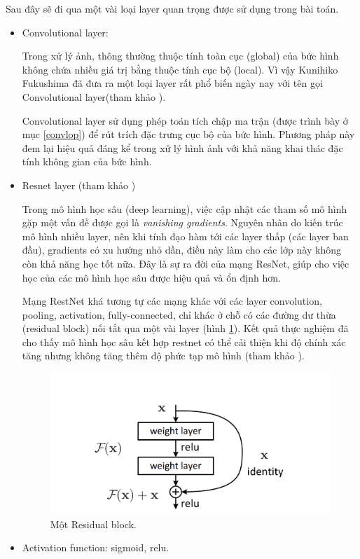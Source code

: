 Sau đây sẽ đi qua một vài loại layer quan trọng được sử dụng trong bài toán.
\begin{itemize}
    \item Convolutional layer:

    Trong xử lý ảnh, thông thường thuộc tính toàn cục (global) của bức hình không chứa nhiều giá trị bằng thuộc tính cục bộ (local). Vì vậy Kunihiko Fukushima đã đưa ra một loại layer rất phổ biến ngày nay với tên gọi Convolutional  layer(tham khảo \cite{fukushima1988neocognitron}).
    
    Convolutional layer sử dụng phép toán tích chập ma trận (được trình bày ở mục \ref{convlop}) để rút trích đặc trưng cục bộ của bức hình. Phương pháp này đem lại hiệu quả đáng kể trong xử lý hình ảnh với khả năng khai thác đặc tính không gian của bức hình.

    \item Resnet layer (tham khảo \cite{he2016deep})
    
    Trong mô hình học sâu (deep learning), việc cập nhật các tham số mô hình gặp một vấn đề được gọi là \textit{vanishing gradients}. Nguyên nhân do kiến trúc mô hình nhiều layer, nên khi tính đạo hàm tới các layer thấp (các layer ban đầu), gradients có xu hướng nhỏ dần, điều này làm cho các lớp này không còn khả năng học tốt nữa. Đây là sự ra đời của mạng ResNet, giúp cho việc học của các mô hình học sâu được hiệu quả và ổn định hơn.

    Mạng RestNet khá tương tự các mạng khác với các layer convolution, pooling, activation, fully-connected, chỉ khác ở chỗ có các đường dư thừa (residual block) nối tắt qua một vài layer (hình \ref{fig:restnet}). Kết quả thực nghiệm đã cho thấy mô hình học sâu kết hợp restnet có thể cải thiện khi độ chính xác tăng nhưng không tăng thêm độ phức tạp mô hình (tham khảo \cite{he2016deep}).

    \begin{figure}[t]
        \begin{center}
            \includegraphics[scale=0.2]{asset/image/restnet.png}
            \caption{Một Residual block. }
            \label{fig:restnet}
        \end{center}
    \end{figure}
    \item Activation function: sigmoid, relu.
    

\end{itemize}

